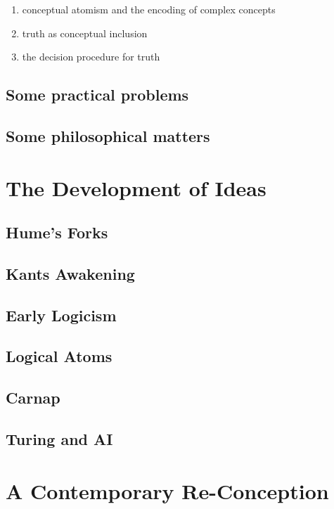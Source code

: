 \begin{enumerate}
\item conceptual atomism and the encoding of complex concepts
\item truth as conceptual inclusion
\item the decision procedure for truth
\end{enumerate}

\subsection{Some practical problems}

\subsection{Some philosophical matters}

\section{The Development of Ideas}

\subsection{Hume's Forks}

\subsection{Kants Awakening}

\subsection{Early Logicism}

\subsection{Logical Atoms}

\subsection{Carnap}

\subsection{Turing and AI}

\section{A Contemporary Re-Conception}

